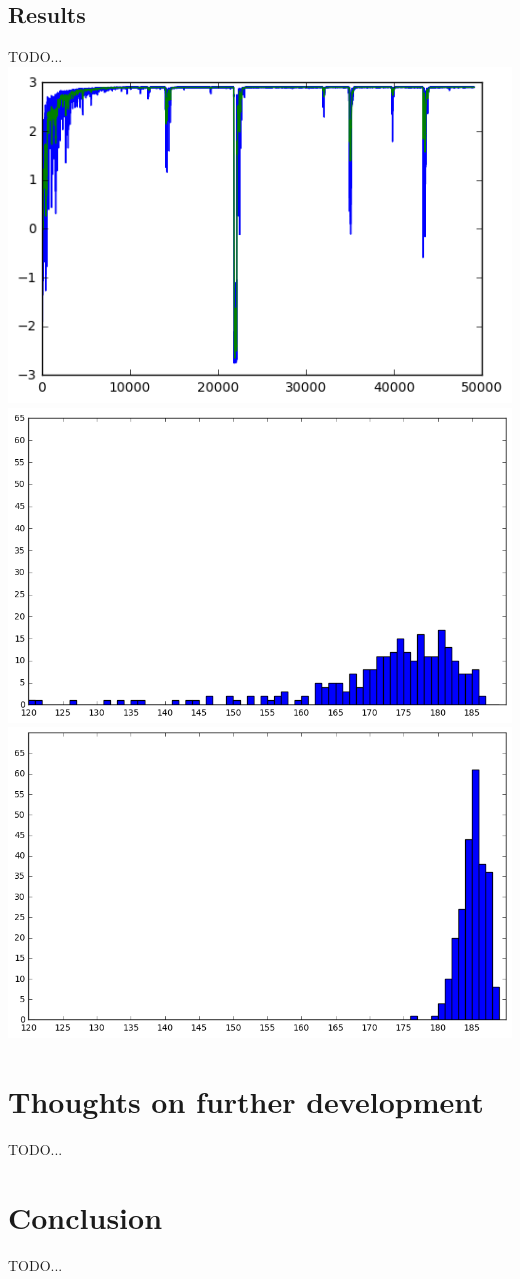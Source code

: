 \documentclass{article}
\begin{document}
\subsection{Results}
TODO...
\includegraphics[scale=1]{img/learning_curve.png}
\includegraphics[scale=1]{img/result_nfm.png}
\includegraphics[scale=1]{img/result_blowfish.png}



\section{Thoughts on further development}
TODO...



\section{Conclusion}
TODO...





\end{document}
